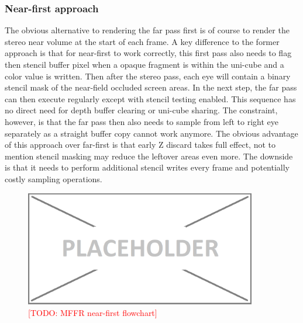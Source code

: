 \subsubsection{Near-first approach}
The obvious alternative to rendering the far pass first is of course to render the stereo near volume at the start of each frame. A key difference to the former approach is that for near-first to work correctly, this first pass also needs to flag then stencil buffer pixel when a opaque fragment is within the uni-cube and a color value is written. Then after the stereo pass, each eye will contain a binary stencil mask of the near-field occluded screen areas. In the next step, the far pass can then execute regularly except with stencil testing enabled. This sequence has no direct need for depth buffer clearing or uni-cube sharing. The constraint, however, is that the far pass then also needs to sample from left to right eye separately as a straight buffer copy cannot work anymore. 
The obvious advantage of this approach over far-first is that early Z discard takes full effect, not to mention stencil masking may reduce the leftover areas even more. The downside is that it needs to perform additional stencil writes every frame and potentially costly sampling operations.

\begin{figure}[htb]
  \centering
  \includegraphics[width=0.9\textwidth]{pictures/placeholder}
  \caption{\textcolor{red}{[TODO: MFFR near-first flowchart]}} \label{fig:blob}
\end{figure}
 
